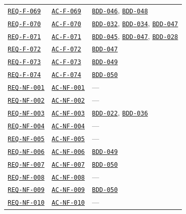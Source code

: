 \documentclass[11pt,a4paper]{article}
\begin{document}
\begin{longtable}{p{3.1cm} p{3.0cm} >{\raggedright\arraybackslash}p{9.1cm}}
\hyperlink{REQ-F-069}{\texttt{REQ-F-069}} & \hyperlink{AC-F-069}{\texttt{AC-F-069}} & \hyperlink{BDD-046}{\texttt{BDD-046}}, \hyperlink{BDD-048}{\texttt{BDD-048}} \\
\hyperlink{REQ-F-070}{\texttt{REQ-F-070}} & \hyperlink{AC-F-070}{\texttt{AC-F-070}} & \hyperlink{BDD-032}{\texttt{BDD-032}}, \hyperlink{BDD-034}{\texttt{BDD-034}}, \hyperlink{BDD-047}{\texttt{BDD-047}} \\
\hyperlink{REQ-F-071}{\texttt{REQ-F-071}} & \hyperlink{AC-F-071}{\texttt{AC-F-071}} & \hyperlink{BDD-045}{\texttt{BDD-045}}, \hyperlink{BDD-047}{\texttt{BDD-047}}, \hyperlink{BDD-028}{\texttt{BDD-028}} \\
\hyperlink{REQ-F-072}{\texttt{REQ-F-072}} & \hyperlink{AC-F-072}{\texttt{AC-F-072}} & \hyperlink{BDD-047}{\texttt{BDD-047}} \\
\hyperlink{REQ-F-073}{\texttt{REQ-F-073}} & \hyperlink{AC-F-073}{\texttt{AC-F-073}} & \hyperlink{BDD-049}{\texttt{BDD-049}} \\
\hyperlink{REQ-F-074}{\texttt{REQ-F-074}} & \hyperlink{AC-F-074}{\texttt{AC-F-074}} & \hyperlink{BDD-050}{\texttt{BDD-050}} \\
\hyperlink{REQ-NF-001}{\texttt{REQ-NF-001}} & \hyperlink{AC-NF-001}{\texttt{AC-NF-001}} & — \\
\hyperlink{REQ-NF-002}{\texttt{REQ-NF-002}} & \hyperlink{AC-NF-002}{\texttt{AC-NF-002}} & — \\
\hyperlink{REQ-NF-003}{\texttt{REQ-NF-003}} & \hyperlink{AC-NF-003}{\texttt{AC-NF-003}} & \hyperlink{BDD-022}{\texttt{BDD-022}}, \hyperlink{BDD-036}{\texttt{BDD-036}} \\
\hyperlink{REQ-NF-004}{\texttt{REQ-NF-004}} & \hyperlink{AC-NF-004}{\texttt{AC-NF-004}} & — \\
\hyperlink{REQ-NF-005}{\texttt{REQ-NF-005}} & \hyperlink{AC-NF-005}{\texttt{AC-NF-005}} & — \\
\hyperlink{REQ-NF-006}{\texttt{REQ-NF-006}} & \hyperlink{AC-NF-006}{\texttt{AC-NF-006}} & \hyperlink{BDD-049}{\texttt{BDD-049}} \\
\hyperlink{REQ-NF-007}{\texttt{REQ-NF-007}} & \hyperlink{AC-NF-007}{\texttt{AC-NF-007}} & \hyperlink{BDD-050}{\texttt{BDD-050}} \\
\hyperlink{REQ-NF-008}{\texttt{REQ-NF-008}} & \hyperlink{AC-NF-008}{\texttt{AC-NF-008}} & — \\
\hyperlink{REQ-NF-009}{\texttt{REQ-NF-009}} & \hyperlink{AC-NF-009}{\texttt{AC-NF-009}} & \hyperlink{BDD-050}{\texttt{BDD-050}} \\
\hyperlink{REQ-NF-010}{\texttt{REQ-NF-010}} & \hyperlink{AC-NF-010}{\texttt{AC-NF-010}} & — \\

\end{longtable}
\end{document}
